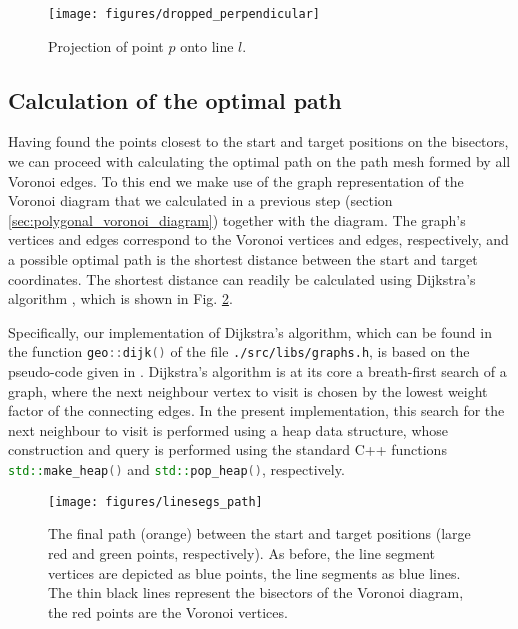 \begin{figure}[htb]
	\begin{center}
		\texttt{[image: figures/dropped\_perpendicular]}
	\end{center}
	\caption[Projection of a point onto a line.]{Projection of point $p$ onto line $l$.
		\label{fig:dropped_perpendicular}}
\end{figure}



\subsection{Calculation of the optimal path}
\label{sec:optimalpath}

Having found the points closest to the start and target positions on the bisectors, we can
proceed with calculating the optimal path on the path mesh formed by all Voronoi edges.
To this end we make use of the graph representation of the Voronoi diagram that we calculated
in a previous step (section \ref{sec:polygonal_voronoi_diagram}) together with the diagram.
The graph's vertices and edges correspond to the Voronoi vertices and edges, respectively,
and a possible optimal path is the shortest distance between the start and target coordinates.
The shortest distance can readily be calculated using Dijkstra's algorithm \cite{wiki_dijkstra},
which is shown in Fig. \ref{fig:linesegs_path}.

Specifically, our implementation of Dijkstra's algorithm, which can be found in the function 
\lstinline[language=C++]|geo::dijk()| of the file \lstinline|./src/libs/graphs.h|, is based on the pseudo-code 
given in \cite[unit 4, p. 17]{FUH_algo2021}. Dijkstra's algorithm is at its core a breath-first
search of a graph, where the next neighbour vertex to visit is chosen by the lowest weight
factor of the connecting edges. In the present implementation, this search for the next neighbour
to visit is performed using a heap data structure, whose construction and query is performed
using the standard C++ functions \lstinline[language=C++]|std::make_heap()| and 
\lstinline[language=C++]|std::pop_heap()|, respectively.


\begin{figure}[htb]
	\begin{center}
		\texttt{[image: figures/linesegs\_path]}
	\end{center}
	\caption[Path between a start and a target position.]{
		The final path (orange) between the start and target positions (large red and green points, respectively).
		As before, the line segment vertices are depicted as blue points, the line segments as blue lines.
		The thin black lines represent the bisectors of the Voronoi diagram, the red points are the Voronoi vertices.
		\label{fig:linesegs_path}}
\end{figure}



